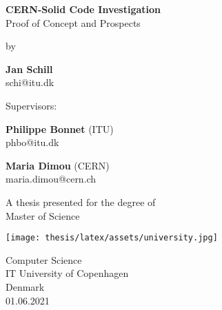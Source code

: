 \begin{titlepage}
   \begin{center}
       \vspace*{1cm}
       \Huge
       \textbf{CERN-Solid Code Investigation}\\
       \LARGE
       \vspace{0.5cm}
        Proof of Concept and Prospects\\
        
       \vspace{1cm}
       
       \normalsize
        by\\
        
       \vspace{1cm}
       
       \Large
       \textbf{Jan Schill}\\
        schi@itu.dk
        
       \vfill
       
       \normalsize
        Supervisors:\\
        
       \vspace{0.3cm}
       
       \textbf{Philippe Bonnet} (ITU)\\
        phbo@itu.dk
        
       \vspace{0.3cm}
       
       \textbf{Maria Dimou} (CERN)\\
        maria.dimou@cern.ch
        
       
       \vspace{1cm}
       
        A thesis presented for the degree of\\
        Master of Science
        
       \vspace{1.5cm}
       
       \texttt{[image: thesis/latex/assets/university.jpg]}
       
       Computer Science\\
       IT University of Copenhagen\\
       Denmark\\
       01.06.2021
            
   \end{center}
\end{titlepage}
